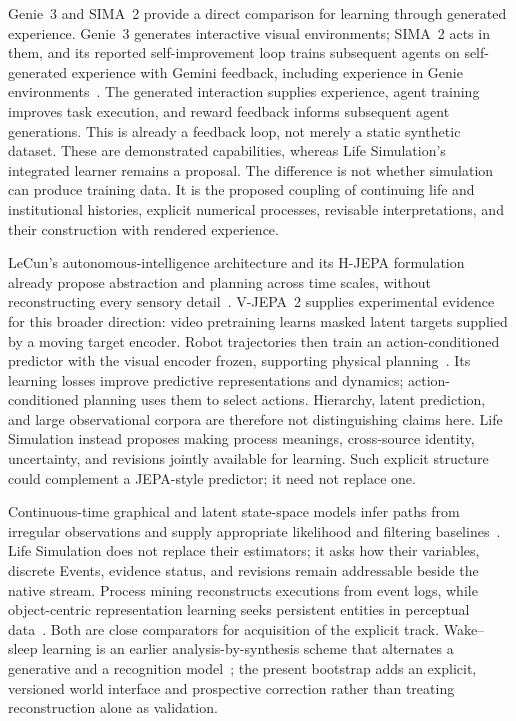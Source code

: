 \documentclass[10pt]{article}
\begin{document}
Genie~3 and SIMA~2 provide a direct comparison for learning through generated
experience. Genie~3 generates interactive visual environments; SIMA~2 acts in
them, and its reported self-improvement loop trains subsequent agents on
self-generated experience with Gemini feedback, including experience in
Genie environments~\cite{parkerHolderFruchter2025genie3,simaTeam2025sima2}.
The generated interaction supplies experience, agent training improves task
execution, and reward feedback informs subsequent agent generations. This is
already a feedback loop, not merely a static synthetic dataset.
These are demonstrated capabilities, whereas Life Simulation's integrated
learner remains a proposal. The difference is not whether simulation can
produce training data. It is the proposed coupling of continuing life and
institutional histories, explicit numerical processes, revisable
interpretations, and their construction with rendered experience.

LeCun's autonomous-intelligence architecture and its H-JEPA formulation
already propose abstraction and planning across time scales, without
reconstructing every sensory detail~\cite{lecun2022autonomous,
dawidLecun2023latent}. V-JEPA~2 supplies experimental evidence for this broader
direction: video pretraining learns masked latent targets supplied by a moving
target encoder. Robot trajectories then train an action-conditioned predictor
with the visual encoder frozen, supporting physical
planning~\cite{assran2025vjepa2}. Its learning losses improve predictive
representations and dynamics; action-conditioned planning uses them to select
actions. Hierarchy, latent prediction, and large
observational corpora are therefore not distinguishing claims here. Life
Simulation instead proposes making process meanings, cross-source identity,
uncertainty, and revisions jointly available for learning. Such explicit
structure could complement a JEPA-style predictor; it need not replace one.

Continuous-time graphical and latent state-space models infer paths from
irregular observations and supply appropriate likelihood and filtering
baselines~\cite{nodelmanSheltonKoller2002ctbn,rubanova2019latentOde}. Life
Simulation does not replace their estimators; it asks how their variables,
discrete Events, evidence status, and revisions remain addressable beside the
native stream. Process mining reconstructs executions from event logs, while
object-centric representation learning seeks persistent entities in perceptual
data~\cite{vanDerAalst2016processMining,locatello2020slotAttention}. Both are
close comparators for acquisition of the explicit track. Wake--sleep learning
is an earlier analysis-by-synthesis scheme that alternates a generative and a
recognition model~\cite{hintonDayanFreyNeal1995wakeSleep}; the present bootstrap
adds an explicit, versioned world interface and prospective correction rather
than treating reconstruction alone as validation.
\end{document}
